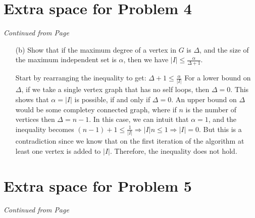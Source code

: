 \documentclass[11pt]{article}
\begin{document}
\newpage
% 
 
% 
%

\section*{Extra space for Problem 4}
\emph{Continued from Page \pageref{pg:end-of-p4}}

\label{pg:p4-continuation}

\begin{itemize}

\item[(b)]  Show that if the maximum degree of a vertex in $G$ is $\Delta$, and the
  size of the maximum independent set is $\alpha$, then we have
  $|I|\leq \frac{\alpha}{\Delta+1}$.

  Start by rearranging the inequality to get: $\Delta+1 \leq \frac{\alpha}{|I|}$
  For a lower bound on $\Delta$, if we take a single vertex graph that has no self loops, 
  then $\Delta =0$. This shows that $\alpha = |I|$ is possible, if and only if $\Delta =0$.
  An upper bound on $\Delta$ would be some completey connected graph, where if $n$
  is the number of vertices then $\Delta = n-1$. In this case, we can intuit that
  $\alpha = 1$, and the inequality becomes 
  $(n-1)+1 \leq \frac{1}{|I|} \Rightarrow |I|n \leq 1 \Rightarrow |I|=0$. But this
  is a contradiction since we know that on the first iteration of the algorithm 
  at least one vertex is added to $|I|$. Therefore, the inequality does not hold. 
 

\end{itemize}


\newpage

\section*{Extra space for Problem 5}
\emph{Continued from Page \pageref{pg:end-of-p5}}
\end{document}
